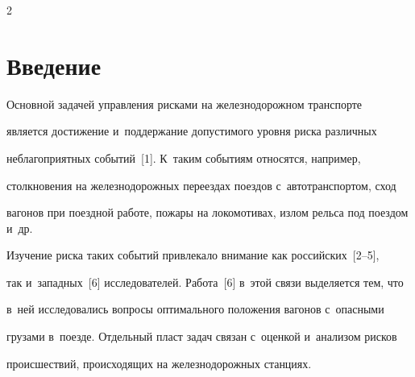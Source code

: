 

  















\thispagestyle{headings}





\begin{multicols}{2}





\label{st\stat}





\section{Введение}





      Основной задачей управления рисками на железнодорожном транспорте 


является достижение и~поддержание допустимого уровня риска различных 


неблагоприятных событий~[1]. К~таким событиям относятся, например, 


столкновения на железнодорожных переездах поездов с~автотранспортом, сход 


вагонов при поездной работе, пожары на локомотивах, излом рельса под поездом и~др. 





Изучение риска таких событий привлекало внимание как российских~[2--5], 


так и~западных~[6] исследователей. Работа~[6] в~этой связи выделяется тем, что 


в~ней исследовались вопросы оптимального положения вагонов с~опасными 


грузами в~поезде. Отдельный пласт задач связан с~оценкой и~анализом рисков 


происшествий, происходящих на железнодорожных станциях.


      



\end{multicols}
